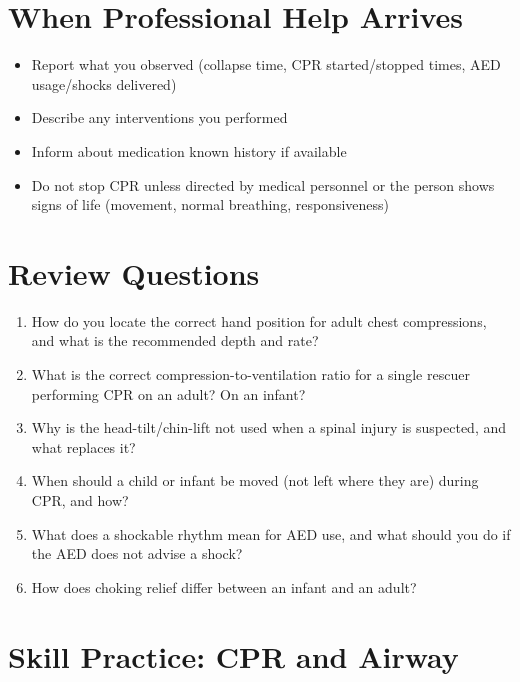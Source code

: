 \section{When Professional Help Arrives}

\begin{itemize}[leftmargin=*]
  \item Report what you observed (collapse time, CPR started/stopped times, AED usage/shocks delivered)
  \item Describe any interventions you performed
  \item Inform about medication known history if available
  \item Do not stop CPR unless directed by medical personnel or the person shows signs of life (movement, normal breathing, responsiveness)
\end{itemize}

\section{Review Questions}

\begin{enumerate}[leftmargin=*]
\item How do you locate the correct hand position for adult chest compressions, and what is the recommended depth and rate?
\item What is the correct compression-to-ventilation ratio for a single rescuer performing CPR on an adult? On an infant?
\item Why is the head-tilt/chin-lift not used when a spinal injury is suspected, and what replaces it?
\item When should a child or infant be moved (not left where they are) during CPR, and how?
\item What does a shockable rhythm mean for AED use, and what should you do if the AED does not advise a shock?
\item How does choking relief differ between an infant and an adult?
\end{enumerate}
\section{Skill Practice: CPR and Airway}

